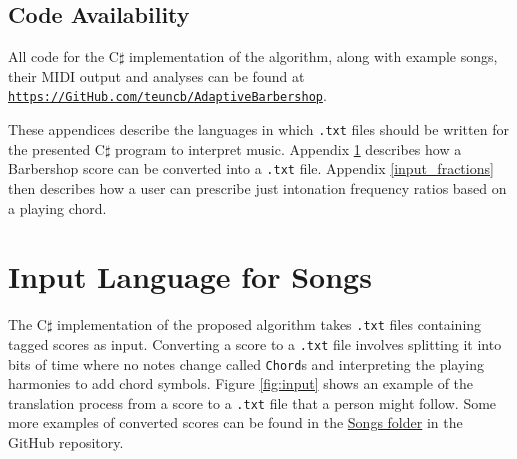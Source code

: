 \documentclass[a4paper]{article}
\begin{document}
\subsection{Code Availability}
All code for the C$\sharp$ implementation of the algorithm, along with example songs, their MIDI output and analyses can be found at \texttt{\url{https://GitHub.com/teuncb/AdaptiveBarbershop}}.

% 
% 

\newpage

\printbibliography
{}

\newpage

\begin{appendices}
These appendices describe the languages in which \texttt{.txt} files should be written for the presented C$\sharp$ program to interpret music. Appendix \ref{input_songs} describes how a Barbershop score can be converted into a \texttt{.txt} file. Appendix \ref{input_fractions} then describes how a user can prescribe just intonation frequency ratios based on a playing chord.

\section{Input Language for Songs}
\label{input_songs}
The C$\sharp$ implementation of the proposed algorithm takes \texttt{.txt} files containing tagged scores as input. Converting a score to a \texttt{.txt} file involves splitting it into bits of time where no notes change called \texttt{Chord}s and interpreting the playing harmonies to add chord symbols. Figure \ref{fig:input} shows an example of the translation process from a score to a \texttt{.txt} file that a person might follow. Some more examples of converted scores can be found in the \href{https://github.com/teuncb/AdaptiveBarbershop/tree/main/Songs}{Songs folder} in the GitHub repository.


\end{appendices}
\end{document}
